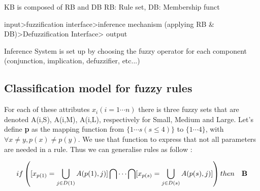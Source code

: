 \documentclass[a4paper,12pt]{article}
\begin{document}
KB is composed of RB and DB
RB: Rule set, DB: Membership funct

input>fuzzification interface>inference mechanism (applying RB \& DB)>Defuzzification Interface> output






Inference System is set up by choosing the fuzzy operator for each component (conjunction, implication, defuzzifier, etc...)



\subsection{Classification model for fuzzy rules}
For each of these attributes $x_{i}(i=1\cdots n)$ there is three fuzzy sets that are denoted A(i,S), A(i,M), A(i,L), respectively for Small, Medium and Large.
Let's define \textbf{p} as the mapping function from $\{1\cdots s(s\leq4)\}$ to $\{1\cdots4\}$, with $\forall x\neq y, p(x)\neq p(y)$. We use that function to express that not all parameters are needed in a rule.
Thus we can generalise rules as follow :

\[if \left( [x_{p(1)}=\bigcup_{j\in D(1)}A(p(1),j) ] \bigcap\cdots\bigcap[x_{p(s)}=\bigcup_{j\in D(s)}A(p(s),j) ] \right) then\quad \bf B \] 
\end{document}
